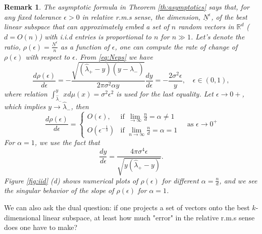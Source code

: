 \documentclass[11pt]{amsart}
\newtheorem{remark}{Remark}[section]
\begin{document}
\begin{remark}
\label{re:derivative}
The asymptotic formula in Theorem \ref{th:asymptotics} says that, for any fixed tolerance $\epsilon>0$ in relative r.m.s sense, the dimension, $\underline{N}^{\epsilon}$, of the best linear subspace that can approximately embed a set of $n$ random vectors in $\mathbb{R}^d$ ($d=O(n)$) with i.i.d entries is proportional to $n$ for $n\gg 1$. Let's denote the ratio, $\rho(\epsilon)=\frac{\underline{N}^{\epsilon}}{n}$ as a function of $\epsilon$, 
one can compute the rate of change of $\rho(\epsilon)$ with respect to $\epsilon$. From \eqref{eq:Neps} we have
\begin{equation}
\frac{d\rho(\epsilon)}{d\epsilon}=- \frac{\sqrt{(\hat{\lambda}_+ - y)(y- \hat{\lambda}_-)}}{2  \pi \sigma^2 \alpha y}  \frac{dy}{d \epsilon}=-\frac{2 \sigma^2 \epsilon}{y} , \quad \epsilon \in (0, 1),
\end{equation}
where relation $\int_{\hat{\lambda}_-}^{y} x d\mu(x) =  \sigma^2 \epsilon^2$ is used for the last equality. Let $\epsilon\rightarrow 0+$, which implies $y\rightarrow \hat{\lambda}_-$, then 
\[
\frac{d \rho(\epsilon)}{d\epsilon} = \left\{
\begin{array}{ll}
O( \epsilon), & \mbox{if } \lim_{\rightarrow\infty}\frac{n}{d}=\alpha\ne 1
\\
O(\epsilon^{-\frac{1}{3}}) &  \mbox{if } \lim_{n\rightarrow\infty}\frac{n}{d}=\alpha = 1
\end{array}\right.
\quad \mbox{as } \epsilon \rightarrow 0^+
\]
For $\alpha=1$, we use the fact that 
\[
\frac{dy}{d \epsilon} = \frac{4 \pi \sigma^4  \epsilon}{\sqrt{y(\hat{\lambda}_+-y)} }.
\]
Figure \ref{fig:iid} (d) shows numerical plots of $\rho(\epsilon)$ for different $\alpha=\frac{n}{d}$, and we see the singular behavior of the slope of $\rho(\epsilon)$ for $\alpha=1$.
\end{remark}

We can also ask the dual question: if one projects a set of vectors onto the best $k$-dimensional linear subspace, at least how much "error" in the relative r.m.s sense does one have to make? 
\end{document}

